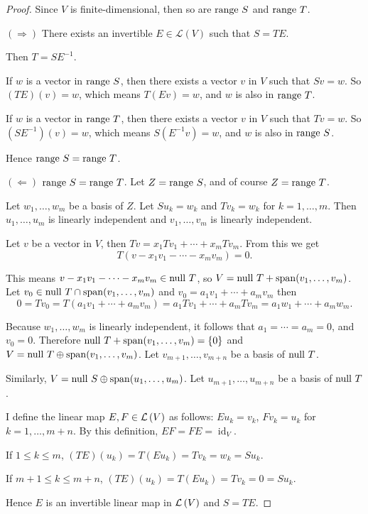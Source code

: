\begin{proof}
    Since $V$ is finite-dimensional, then so are $\operatorname{range}\,{S}$ and $\operatorname{range}\,{T}$.

    $(\Rightarrow)$ There exists an invertible $E \in \mathcal{L}(V)$ such that $S = TE$.

    Then $T = SE^{-1}$.

    If $w$ is a vector in $\operatorname{range}\,{S}$, then there exists a vector $v$ in $V$ such that $Sv = w$. So $(TE)(v) = w$, which means $T(Ev) = w$, and $w$ is also in $\operatorname{range}\,{T}$.

    If $w$ is a vector in $\operatorname{range}\,{T}$, then there exists a vector $v$ in $V$ such that $Tv = w$. So $(SE^{-1})(v) = w$, which means $S(E^{-1}v) = w$, and $w$ is also in $\operatorname{range}\,{S}$.

    Hence $\operatorname{range}\,{S} = \operatorname{range}\,{T}$.

    $(\Leftarrow)$ $\operatorname{range}\,{S} = \operatorname{range}\,{T}$. Let $Z = \operatorname{range}\,{S}$, and of course $Z = \operatorname{range}\,{T}$.

    Let $w_{1}, \ldots, w_{m}$ be a basis of $Z$. Let $Su_{k} = w_{k}$ and $Tv_{k} = w_{k}$ for $k = 1, \ldots, m$. Then $u_{1}, \ldots, u_{m}$ is linearly independent and $v_{1}, \ldots, v_{m}$ is linearly independent.

    Let $v$ be a vector in $V$, then $Tv = x_{1}Tv_{1} + \cdots + x_{m}Tv_{m}$. From this we get
    \[
        T(v - x_{1}v_{1} - \cdots - x_{m}v_{m}) = 0.
    \]

    This means $v - x_{1}v_{1} - \cdots - x_{m}v_{m}\in \operatorname{null}\,{T}$, so $V = \operatorname{null}\,{T} + \operatorname{span}(v_{1}, \ldots, v_{m})$. Let $v_{0}\in \operatorname{null}\,{T} \cap \operatorname{span}(v_{1}, \ldots, v_{m})$ and $v_{0} = a_{1}v_{1} + \cdots + a_{m}v_{m}$ then
    \[
        0 = Tv_{0} = T(a_{1}v_{1} + \cdots + a_{m}v_{m}) = a_{1}Tv_{1} + \cdots + a_{m}Tv_{m} = a_{1}w_{1} + \cdots + a_{m}w_{m}.
    \]

    Because $w_{1}, \ldots, w_{m}$ is linearly independent, it follows that $a_{1} = \cdots = a_{m} = 0$, and $v_{0} = 0$. Therefore $\operatorname{null}\,{T} + \operatorname{span}(v_{1}, \ldots, v_{m}) = \{0\}$ and $V = \operatorname{null}\,{T} \oplus \operatorname{span}(v_{1}, \ldots, v_{m})$. Let $v_{m+1}, \ldots, v_{m+n}$ be a basis of $\operatorname{null}\,{T}$.

    Similarly, $V = \operatorname{null}\,{S} \oplus\operatorname{span}(u_{1}, \ldots, u_{m})$. Let $u_{m+1}, \ldots, u_{m+n}$ be a basis of $\operatorname{null}\,{T}$.

    I define the linear map $E,F\in\mathcal{L}\left({V}\right)$ as follows: $Eu_{k} = v_{k}$, $Fv_{k} = u_{k}$ for $k = 1,\ldots, m+n$. By this definition, $EF = FE = \operatorname{id}_{V}$.

    If $1\leq k\leq m$, $(TE)(u_{k}) = T(Eu_{k}) = Tv_{k} = w_{k} = Su_{k}$.

    If $m+1\leq k\leq m+n$, $(TE)(u_{k}) = T(Eu_{k}) = Tv_{k} = 0 = Su_{k}$.

    Hence $E$ is an invertible linear map in $\mathcal{L}\left({V}\right)$ and $S = TE$.
\end{proof}
\newpage

